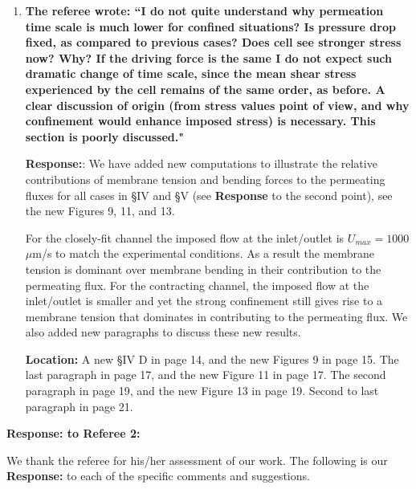 \documentclass[12pt]{article}
\begin{document}
\begin{enumerate}
\item{\bf
The referee wrote:
``I do not quite understand why permeation time scale is much lower
for confined situations? Is pressure drop fixed, as compared to
previous cases? Does cell see stronger stress now? Why? If the driving
force is the same I do not expect such dramatic change of time scale,
since the mean shear stress experienced by the cell remains of the
same order, as before. A clear discussion of origin (from stress
values point of view, and why confinement would enhance imposed
stress) is necessary. This section is poorly discussed."}

\noindent
{\bf Response:}:  We have added new computations to illustrate the relative contributions of membrane tension and bending forces to the permeating fluxes for all cases in \S IV and \S V (see {\bf Response} to the second point), see the new Figures 9, 11, and 13.

For the closely-fit channel the imposed flow at the inlet/outlet is
$U_{max}=1000$ $\mu$m/s to match the experimental conditions. As a
result the membrane tension is dominant over membrane bending in their
contribution to the permeating flux. For the contracting channel, the
imposed flow at the inlet/outlet is smaller and yet the strong
confinement still gives rise to a membrane tension that dominates in
contributing to the permeating flux. We also added new paragraphs to
discuss these new results.

\noindent
{\bf Location:} A new \S IV D in page 14, and the new Figures 9 in page 15. The last paragraph in page 17, and the new Figure 11 in page 17. The second paragraph in page 19, and the new Figure 13 in page 19. Second to last paragraph in page 21.

\end{enumerate}

\newpage
\vspace{0.5cm}
{\large \bf {\bf Response:} to Referee 2:}
\vspace{0.5cm}

We thank the referee for his/her assessment of our work.  
The following is
our {\bf Response:} to each of the specific comments and suggestions.
\end{document}
